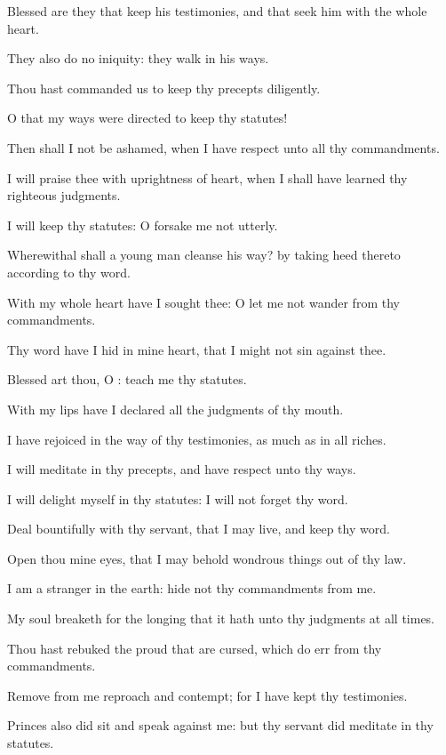 \verse Blessed are they that keep his testimonies, and that seek him with the whole heart.

\verse They also do no iniquity: they walk in his ways.

\verse Thou hast commanded us to keep thy precepts diligently.

\verse O that my ways were directed to keep thy statutes!

\verse Then shall I not be ashamed, when I have respect unto all thy commandments.

\verse I will praise thee with uprightness of heart, when I shall have learned thy righteous judgments.

\verse I will keep thy statutes: O forsake me not utterly.

\verse Wherewithal shall a young man cleanse his way? by taking heed thereto according to thy word.

\verse With my whole heart have I sought thee: O let me not wander from thy commandments.

\verse Thy word have I hid in mine heart, that I might not sin against thee.

\verse Blessed art thou, O \LORD: teach me thy statutes.

\verse With my lips have I declared all the judgments of thy mouth.

\verse I have rejoiced in the way of thy testimonies, as much as in all riches.

\verse I will meditate in thy precepts, and have respect unto thy ways.

\verse I will delight myself in thy statutes: I will not forget thy word.

\verse Deal bountifully with thy servant, that I may live, and keep thy word.

\verse Open thou mine eyes, that I may behold wondrous things out of thy law.

\verse I am a stranger in the earth: hide not thy commandments from me.

\verse My soul breaketh for the longing that it hath unto thy judgments at all times.

\verse Thou hast rebuked the proud that are cursed, which do err from thy commandments.

\verse Remove from me reproach and contempt; for I have kept thy testimonies.

\verse Princes also did sit and speak against me: but thy servant did meditate in thy statutes.

